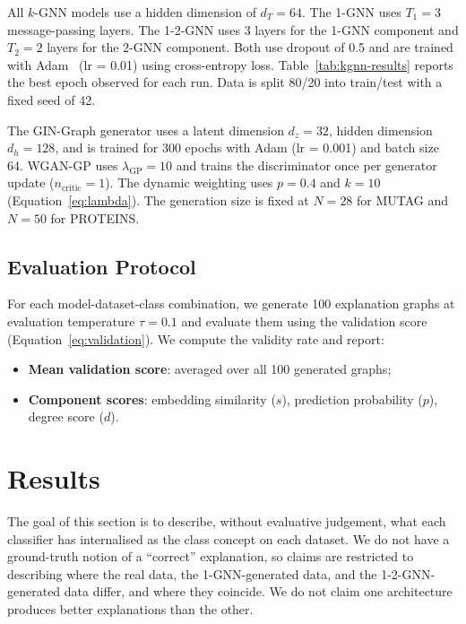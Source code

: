 \documentclass[12pt,a4paper]{article}
\begin{document}
All $k$-GNN models use a hidden dimension of $d_T = 64$. The 1-GNN uses $T_1 = 3$ message-passing layers. The 1-2-GNN uses 3 layers for the 1-GNN component and $T_2 = 2$ layers for the 2-GNN component. Both use dropout of 0.5 and are trained with Adam~\cite{kingma2015adam} (lr = 0.01) using cross-entropy loss. Table~\ref{tab:kgnn-results} reports the best epoch observed for each run. Data is split 80/20 into train/test with a fixed seed of 42.

The GIN-Graph generator uses a latent dimension $d_z = 32$, hidden dimension $d_h = 128$, and is trained for 300 epochs with Adam (lr = 0.001) and batch size 64. WGAN-GP uses $\lambda_{\text{GP}} = 10$ and trains the discriminator once per generator update ($n_{\text{critic}} = 1$). The dynamic weighting uses $p = 0.4$ and $k = 10$ (Equation~\ref{eq:lambda}). The generation size is fixed at $N = 28$ for MUTAG and $N = 50$ for PROTEINS.

\subsection{Evaluation Protocol}

For each model-dataset-class combination, we generate 100 explanation graphs at evaluation temperature $\tau = 0.1$ and evaluate them using the validation score (Equation~\ref{eq:validation}). We compute the validity rate and report:
\begin{itemize}[nosep]
  \item \textbf{Mean validation score}: averaged over all 100 generated graphs;
  \item \textbf{Component scores}: embedding similarity ($s$), prediction probability ($p$), degree score ($d$).
\end{itemize}

\section{Results}
\label{sec:results}

The goal of this section is to describe, without evaluative judgement, what each classifier has internalised as the class concept on each dataset. We do not have a ground-truth notion of a ``correct'' explanation, so claims are restricted to describing where the real data, the 1-GNN-generated data, and the 1-2-GNN-generated data differ, and where they coincide. We do not claim one architecture produces better explanations than the other.
\end{document}
